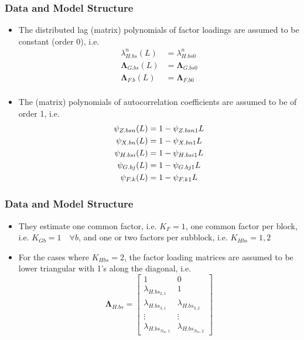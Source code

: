 \documentclass[10pt, compress, notheorems, aspectratio=169]{beamer}
\let\originalleft\left
\let\originalright\right
\renewcommand{\left}{\mathopen{}\mathclose \bgroup \originalleft}
\renewcommand{\right}{\aftergroup \egroup \originalright}
\begin{document}
\begin{frame}
	\frametitle{Data and Model Structure}
	\begin{itemize}
		\item The distributed lag (matrix) polynomials of factor loadings are assumed to be constant (order 0), i.e.
			\begin{align*}
				{\lambda}^n_{H.bs} (L) &= {\lambda}^n_{H.bs 0} \\
				{\bm \Lambda}_{G.bs} (L) &= {\bm \Lambda}_{G.bs 0} \\ 
				{\bm \Lambda}_{F.b} (L) &= {\bm \Lambda}_{F.b 0} \\  
			\end{align*}
			\vspace{-3em}
		\item The (matrix) polynomials of autocorrelation coefficients are assumed to be of order 1, i.e.
			\begin{align*}
				{\psi}_{Z.bsn} \left( L \right) &= 1 - {\psi}_{Z.bsn1} L \\
				{\psi}_{X.bn} \left( L \right) &= 1 - {\psi}_{X.bn1} L \\
				{\psi}_{H.bsi} \left( L \right) &= 1 - {\psi}_{H.bsi1} L \\
				{\psi}_{G.bj} \left( L \right) &= 1 - {\psi}_{G.bj1} L \\
				{\psi}_{F.k} \left( L \right) &= 1 - {\psi}_{F.k1} L
			\end{align*}
	\end{itemize}
\end{frame}

\begin{frame}
	\frametitle{Data and Model Structure}
	\begin{itemize}
		\item They estimate one common factor, i.e. $K_F = 1$, one common factor per block, i.e. $K_{Gb}=1 \quad \forall b$, and one or two factors per subblock, i.e. $K_{Hbs} = 1, 2$
		\item For the cases where $K_{Hbs} = 2$, the factor loading matrices are assumed to be lower triangular with 1's along the diagonal, i.e.
			\begin{equation*}
				{\bm \Lambda}_{H.bs} = 
				\begin{bmatrix}
					1 & 0 \\ \lambda_{{H.bs}_{2,1}} & 1 \\ \lambda_{{H.bs}_{3,1}} & \lambda_{{H.bs}_{3,2}} \\ \vdots & \vdots \\ \lambda_{{H.bs}_{N_{bs},1}} & \lambda_{{H.bs}_{N_{bs},2}}
				\end{bmatrix}
			\end{equation*}
	\end{itemize}
\end{frame}
\end{document}
